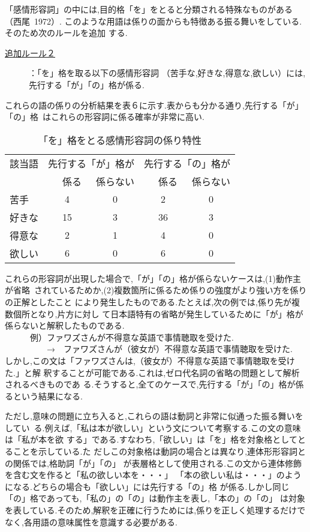 「感情形容詞」の中には,目的格「を」をとると分類される特殊なものがある（西尾~1972）.
このような用語は係りの面からも特徴ある振る舞いをしている.そのため次のルールを追加
する.
{\bf \begin{description}
\item[\underline{追加ルール２}]：「を」格を取る以下の感情形容詞
  （苦手な,好きな,得意な,欲しい）には,先行する「が」「の」格が係る.
\end{description}}
これらの語の係りの分析結果を表６に示す.表からも分かる通り,先行する「が」「の」\mbox{格
はこ}れらの形容詞に係る確率が非常に高い.
\begin{table}[h]
\caption{「を」格をとる感情形容詞の係り特性}
\begin{center}
  \begin{tabular}{|l|c|c|c|c|} \hline
    該当語 & \multicolumn{2}{c|}{先行する「が」格が}
    & \multicolumn{2}{c|}{先行する「の」格が}\\ \cline{2-5}
    & 　係る　 & 係らない & 　係る　 & 係らない \\ \hline
    苦手 & 4 & 0 & 2 & 0 \\ \hline
    好きな & 15 & 3 & 36 & 3 \\ \hline
    得意な & 2 & 1 & 4 & 0 \\ \hline
    欲しい & 6 & 0 & 6 & 0 \\ \hline
  \end{tabular}
\end{center}
\end{table}

これらの形容詞が出現した場合で,「が」「の」格が係らないケースは,(1)動作主が\mbox{省略
されて}いるためか,(2)複数箇所に係るため係りの強度がより強い方を係りの正解としたこと
により発生したものである.たとえば,次の例では,係り先が複数個所となり,片方に対し
て日本語特有の省略が発生しているために「が」格が係らないと解釈したものである.\\
　　　例）ファワズさんが不得意な英語で事情聴取を受けた.\\
　　　　　→　ファワズさんが（彼女が）不得意な英語で事情聴取を受けた.\\
しかし,この文は「ファワズさんは,（彼女が）不得意な英語で事情聴取を受けた.」と解
釈することが可能である.これは,ゼロ代名詞の省略の問題として解析されるべきものであ
る.そうすると,全てのケースで,先行する「が」「の」格が係るという結果になる.

ただし,意味の問題に立ち入ると,これらの語は動詞と非常に似通った振る舞いを\mbox{してい
る.例}えば,「私は本が欲しい」という文について考察する.この文の意味は「私が本を欲
する」である.すなわち,「欲しい」は「を」格を対象格としてとることを示している.た
だしこの対象格は動詞の場合とは異なり,連体形形容詞との関係では,格助詞「が」「の」
が表層格として使用される.この文から連体修飾を含む文を作ると「私の欲しい本を・・・」
「本の欲しい私は・・・」のようになる.どちらの場合も「欲しい」には先行する「の」格
が係る.しかし同じ「の」格であっても,「私の」の「の」は動作主を表し,「本の」の「の」
は対象を表している.そのため,解釈を正確に行うためには,係りを正しく処理するだけで
なく,各用語の意味属性を意識する必要がある.

